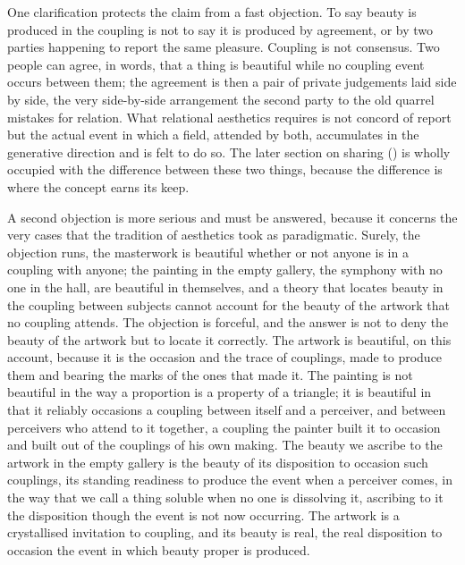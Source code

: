 One clarification protects the claim from a fast objection. To say beauty is produced in the coupling is not to say it is produced by agreement, or by two parties happening to report the same pleasure. Coupling is not consensus. Two people can agree, in words, that a thing is beautiful while no coupling event occurs between them; the agreement is then a pair of private judgements laid side by side, the very side-by-side arrangement the second party to the old quarrel mistakes for relation. What relational aesthetics requires is not concord of report but the actual event in which a field, attended by both, accumulates in the generative direction and is felt to do so. The later section on sharing () is wholly occupied with the difference between these two things, because the difference is where the concept earns its keep.

A second objection is more serious and must be answered, because it concerns the very cases that the tradition of aesthetics took as paradigmatic. Surely, the objection runs, the masterwork is beautiful whether or not anyone is in a coupling with anyone; the painting in the empty gallery, the symphony with no one in the hall, are beautiful in themselves, and a theory that locates beauty in the coupling between subjects cannot account for the beauty of the artwork that no coupling attends. The objection is forceful, and the answer is not to deny the beauty of the artwork but to locate it correctly. The artwork is beautiful, on this account, because it is the occasion and the trace of couplings, made to produce them and bearing the marks of the ones that made it. The painting is not beautiful in the way a proportion is a property of a triangle; it is beautiful in that it reliably occasions a coupling between itself and a perceiver, and between perceivers who attend to it together, a coupling the painter built it to occasion and built out of the couplings of his own making. The beauty we ascribe to the artwork in the empty gallery is the beauty of its disposition to occasion such couplings, its standing readiness to produce the event when a perceiver comes, in the way that we call a thing soluble when no one is dissolving it, ascribing to it the disposition though the event is not now occurring. The artwork is a crystallised invitation to coupling, and its beauty is real, the real disposition to occasion the event in which beauty proper is produced.


